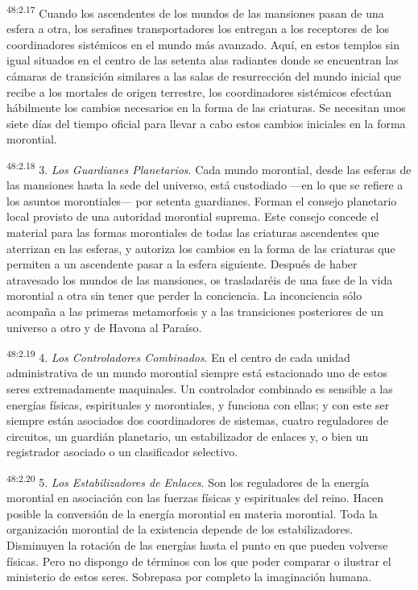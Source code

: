 \par
\textsuperscript{48:2.17} Cuando los ascendentes de los mundos de las mansiones pasan de una esfera a otra, los serafines transportadores los entregan a los receptores de los coordinadores sistémicos en el mundo más avanzado. Aquí, en estos templos sin igual situados en el centro de las setenta alas radiantes donde se encuentran las cámaras de transición similares a las salas de resurrección del mundo inicial que recibe a los mortales de origen terrestre, los coordinadores sistémicos efectúan hábilmente los cambios necesarios en la forma de las criaturas. Se necesitan unos siete días del tiempo oficial para llevar a cabo estos cambios iniciales en la forma morontial.

\par
\textsuperscript{48:2.18} 3. \textit{Los Guardianes Planetarios}. Cada mundo morontial, desde las esferas de las mansiones hasta la sede del universo, está custodiado ---en lo que se refiere a los asuntos morontiales--- por setenta guardianes. Forman el consejo planetario local provisto de una autoridad morontial suprema. Este consejo concede el material para las formas morontiales de todas las criaturas ascendentes que aterrizan en las esferas, y autoriza los cambios en la forma de las criaturas que permiten a un ascendente pasar a la esfera siguiente. Después de haber atravesado los mundos de las mansiones, os trasladaréis de una fase de la vida morontial a otra sin tener que perder la conciencia. La inconciencia sólo acompaña a las primeras metamorfosis y a las transiciones posteriores de un universo a otro y de Havona al Paraíso.

\par
\textsuperscript{48:2.19} 4. \textit{Los Controladores Combinados}. En el centro de cada unidad administrativa de un mundo morontial siempre está estacionado uno de estos seres extremadamente maquinales. Un controlador combinado es sensible a las energías físicas, espirituales y morontiales, y funciona con ellas; y con este ser siempre están asociados dos coordinadores de sistemas, cuatro reguladores de circuitos, un guardián planetario, un estabilizador de enlaces y, o bien un registrador asociado o un clasificador selectivo.

\par
\textsuperscript{48:2.20} 5. \textit{Los Estabilizadores de Enlaces}. Son los reguladores de la energía morontial en asociación con las fuerzas físicas y espirituales del reino. Hacen posible la conversión de la energía morontial en materia morontial. Toda la organización morontial de la existencia depende de los estabilizadores. Disminuyen la rotación de las energías hasta el punto en que pueden volverse físicas. Pero no dispongo de términos con los que poder comparar o ilustrar el ministerio de estos seres. Sobrepasa por completo la imaginación humana.

